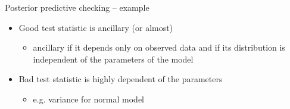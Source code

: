 \documentclass[t]{beamer}
\begin{document}
\begin{frame}[fragile]

  {\Large\color{navyblue} Posterior predictive checking -- example}

  \begin{itemize}
  \item<1-> Good test statistic is ancillary (or almost)
    \begin{itemize}
    \item ancillary if it depends only on observed data and if its
      distribution is independent of the parameters of the model
    \end{itemize}
  \item<2-> Bad test statistic is highly dependent of the parameters
    \begin{itemize}
    \item e.g. variance for normal model
    \end{itemize}
  \end{itemize}
  \vspace{-1.5\baselineskip}

\end{frame}
\end{document}
